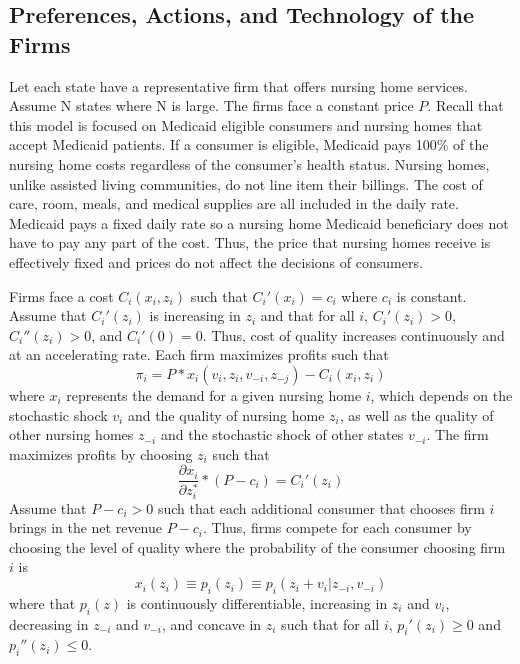 \documentclass[../Main.tex]{subfiles}
\begin{document}
\subsection{Preferences, Actions, and Technology of the Firms}
Let each state have a representative firm that offers nursing home services. Assume N states where N is large. The firms face a constant price $P$. Recall that this model is focused on Medicaid eligible consumers and nursing homes that accept Medicaid patients. If a consumer is eligible, Medicaid pays 100\% of the nursing home costs regardless of the consumer's health status. Nursing homes, unlike assisted living communities, do not line item their billings. The cost of care, room, meals, and medical supplies are all included in the daily rate. Medicaid pays a fixed daily rate so a nursing home Medicaid beneficiary does not have to pay any part of the cost. Thus, the price that nursing homes receive is effectively fixed and prices do not affect the decisions of consumers.

Firms face a cost $C_i(x_i, z_i)$ such that $C_i'(x_i)= c_i$ where $c_i$ is constant. Assume that $C_i'(z_i)$ is increasing in $z_i$ and that for all $i$, $C_i'(z_i)>0$, $C_i''(z_i)>0$, and $C_i'(0)=0$. Thus, cost of quality increases continuously and at an accelerating rate. Each firm maximizes profits such that \begin{equation}\pi_i = P*x_i(v_i, z_i, v_{-i}, z_{-j}) -C_i(x_i, z_i) \end{equation} 
where $x_i$ represents the demand for a given nursing home $i$, which depends on the stochastic shock $v_i$ and the quality of nursing home $z_i$, as well as the quality of other nursing homes $z_{-i}$ and the stochastic shock of other states $v_{-i}$. The firm maximizes profits by choosing $z_i$ such that \begin{equation} \frac{\partial x_i}{\partial z_i^*}*(P-c_i)= C_i'(z_i) \end{equation} Assume that $P - c_i > 0$ such that each additional consumer that chooses firm $i$ brings in the net revenue $P - c_i$. Thus, firms compete for each consumer by choosing the level of quality where the probability of the consumer choosing firm $i$ is \begin{equation} x_{i}(z_i) \equiv p_i(z_i) \equiv p_i(z_i + v_i |z_{-i}, v_{-i}) \end{equation}
where that $p_{i}(z)$ is continuously differentiable, increasing in $z_i$ and $v_i$, decreasing in $z_{-i}$ and $v_{-i}$, and concave in $z_i$ such that for all $i$, $p_{i}'(z_i)\geq 0$ and $p_{i}''(z_i) \leq 0$.
\end{document}
